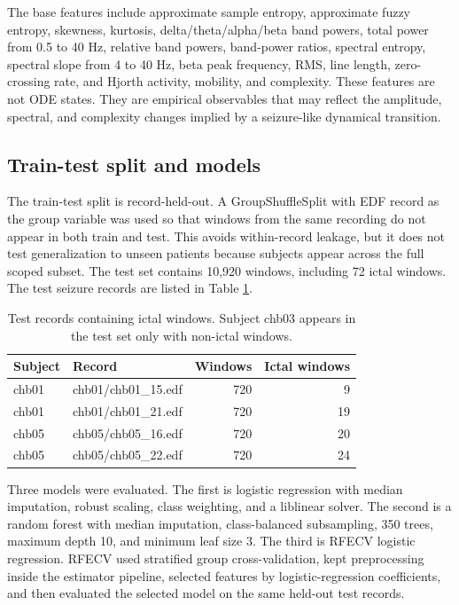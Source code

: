 \documentclass[11pt]{article}
\begin{document}
The base features include approximate sample entropy, approximate fuzzy entropy, skewness, kurtosis, delta/theta/alpha/beta band powers, total power from 0.5 to 40 Hz, relative band powers, band-power ratios, spectral entropy, spectral slope from 4 to 40 Hz, beta peak frequency, RMS, line length, zero-crossing rate, and Hjorth activity, mobility, and complexity. These features are not ODE states. They are empirical observables that may reflect the amplitude, spectral, and complexity changes implied by a seizure-like dynamical transition.

\subsection{Train-test split and models}

The train-test split is record-held-out. A GroupShuffleSplit with EDF record as the group variable was used so that windows from the same recording do not appear in both train and test. This avoids within-record leakage, but it does not test generalization to unseen patients because subjects appear across the full scoped subset. The test set contains 10,920 windows, including 72 ictal windows. The test seizure records are listed in Table \ref{tab:testrecords}.

\begin{table}[H]
\centering
\caption{Test records containing ictal windows. Subject chb03 appears in the test set only with non-ictal windows.}
\label{tab:testrecords}
\begin{tabular}{llrr}
\toprule
Subject & Record & Windows & Ictal windows \\
\midrule
chb01 & chb01/chb01\_15.edf & 720 & 9 \\
chb01 & chb01/chb01\_21.edf & 720 & 19 \\
chb05 & chb05/chb05\_16.edf & 720 & 20 \\
chb05 & chb05/chb05\_22.edf & 720 & 24 \\
\bottomrule
\end{tabular}
\end{table}

Three models were evaluated. The first is logistic regression with median imputation, robust scaling, class weighting, and a liblinear solver. The second is a random forest with median imputation, class-balanced subsampling, 350 trees, maximum depth 10, and minimum leaf size 3. The third is RFECV logistic regression. RFECV used stratified group cross-validation, kept preprocessing inside the estimator pipeline, selected features by logistic-regression coefficients, and then evaluated the selected model on the same held-out test records.
\end{document}

